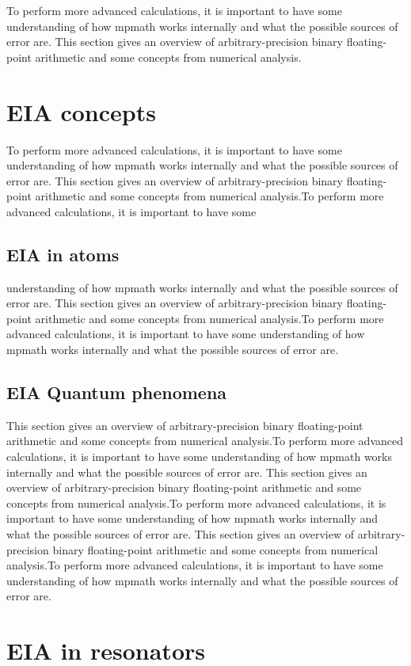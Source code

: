 To perform more advanced calculations, it is important to have some understanding of how mpmath works internally and what the possible sources of error are. This section gives an overview of arbitrary-precision binary floating-point arithmetic and some concepts from numerical analysis.


\section{EIA concepts}
To perform more advanced calculations, it is important to have some understanding of how mpmath works internally and what the possible sources of error are. This section gives an overview of arbitrary-precision binary floating-point arithmetic and some concepts from numerical analysis.To perform more advanced calculations, it is important to have some
\subsection{EIA in atoms}
 understanding of how mpmath works internally and what the possible sources of error are. This section gives an overview of arbitrary-precision binary floating-point arithmetic and some concepts from numerical analysis.To perform more advanced calculations, it is important to have some understanding of how mpmath works internally and what the possible sources of error are. 
\subsection{EIA Quantum phenomena} 
 This section gives an overview of arbitrary-precision binary floating-point arithmetic and some concepts from numerical analysis.To perform more advanced calculations, it is important to have some understanding of how mpmath works internally and what the possible sources of error are. This section gives an overview of arbitrary-precision binary floating-point arithmetic and some concepts from numerical analysis.To perform more advanced calculations, it is important to have some understanding of how mpmath works internally and what the possible sources of error are. This section gives an overview of arbitrary-precision binary floating-point arithmetic and some concepts from numerical analysis.To perform more advanced calculations, it is important to have some understanding of how mpmath works internally and what the possible sources of error are.
\section{EIA in resonators} 
 
